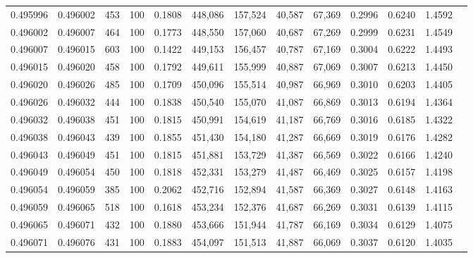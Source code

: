 \begin{tabular}{rrrrrrrrrrrrr}
0.495996 & 0.496002 &   453 & 100 &                                     0.1808 & 448,086 & 157,524 &  40,587 &  67,369 & 0.2996 & 0.6240 & 1.4592 \\
0.496002 & 0.496007 &   464 & 100 &                                     0.1773 & 448,550 & 157,060 &  40,687 &  67,269 & 0.2999 & 0.6231 & 1.4549 \\
0.496007 & 0.496015 &   603 & 100 &                                     0.1422 & 449,153 & 156,457 &  40,787 &  67,169 & 0.3004 & 0.6222 & 1.4493 \\
0.496015 & 0.496020 &   458 & 100 &                                     0.1792 & 449,611 & 155,999 &  40,887 &  67,069 & 0.3007 & 0.6213 & 1.4450 \\
0.496020 & 0.496026 &   485 & 100 &                                     0.1709 & 450,096 & 155,514 &  40,987 &  66,969 & 0.3010 & 0.6203 & 1.4405 \\
0.496026 & 0.496032 &   444 & 100 &                                     0.1838 & 450,540 & 155,070 &  41,087 &  66,869 & 0.3013 & 0.6194 & 1.4364 \\
0.496032 & 0.496038 &   451 & 100 &                                     0.1815 & 450,991 & 154,619 &  41,187 &  66,769 & 0.3016 & 0.6185 & 1.4322 \\
0.496038 & 0.496043 &   439 & 100 &                                     0.1855 & 451,430 & 154,180 &  41,287 &  66,669 & 0.3019 & 0.6176 & 1.4282 \\
0.496043 & 0.496049 &   451 & 100 &                                     0.1815 & 451,881 & 153,729 &  41,387 &  66,569 & 0.3022 & 0.6166 & 1.4240 \\
0.496049 & 0.496054 &   450 & 100 &                                     0.1818 & 452,331 & 153,279 &  41,487 &  66,469 & 0.3025 & 0.6157 & 1.4198 \\
0.496054 & 0.496059 &   385 & 100 &                                     0.2062 & 452,716 & 152,894 &  41,587 &  66,369 & 0.3027 & 0.6148 & 1.4163 \\
0.496059 & 0.496065 &   518 & 100 &                                     0.1618 & 453,234 & 152,376 &  41,687 &  66,269 & 0.3031 & 0.6139 & 1.4115 \\
0.496065 & 0.496071 &   432 & 100 &                                     0.1880 & 453,666 & 151,944 &  41,787 &  66,169 & 0.3034 & 0.6129 & 1.4075 \\
0.496071 & 0.496076 &   431 & 100 &                                     0.1883 & 454,097 & 151,513 &  41,887 &  66,069 & 0.3037 & 0.6120 & 1.4035 \\

\end{tabular}
